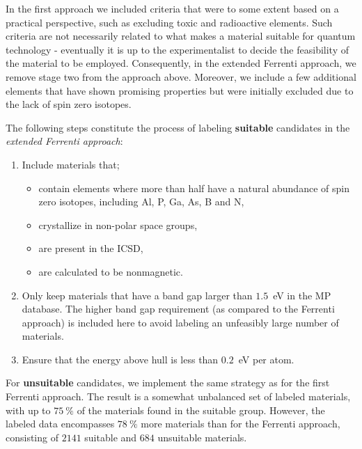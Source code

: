 \documentclass[superscriptaddress,unsortedaddress,
 amsmath,amssymb,
 aps,
]{revtex4-2}
\begin{document}
In the first approach we included criteria that were 
to some extent based on a practical perspective, such as excluding toxic and radioactive elements. Such criteria are not necessarily related to what makes a material suitable for quantum technology - eventually it is up to the experimentalist to decide the feasibility of the material to be employed. 
Consequently, in the extended Ferrenti approach, we remove stage two from the approach above. Moreover, we include a few additional elements that have shown promising properties but were initially excluded due to the lack of spin zero isotopes. 

The following steps constitute the process of labeling \textbf{suitable} candidates in the \emph{extended Ferrenti approach}:
\begin{enumerate}
    \item Include materials that; 
    \begin{itemize}
        \item contain elements where more than half have a natural abundance of spin zero isotopes, including Al, P, Ga, As, B and N, 
        \item crystallize in non-polar space groups,
        \item are present in the ICSD,
        \item are calculated to be nonmagnetic. 
    \end{itemize}
    \item Only keep materials that have a band gap larger than $1.5$~eV in the MP database. The higher band gap requirement (as compared to the Ferrenti approach) is included here %
    to avoid labeling an unfeasibly large number of materials. 
    \item Ensure that the energy above hull is less than $0.2$~eV per atom. 
\end{enumerate}

For \textbf{unsuitable} candidates, we implement the same strategy as for the first Ferrenti approach. The result is a somewhat unbalanced set of labeled materials, with up to $75 \ \%$ of the materials found in the suitable group. However, the labeled data encompasses $78 \ \%$ more materials than for the Ferrenti approach,  consisting of $2141$ suitable and $684$ unsuitable materials.

% 
\end{document}
